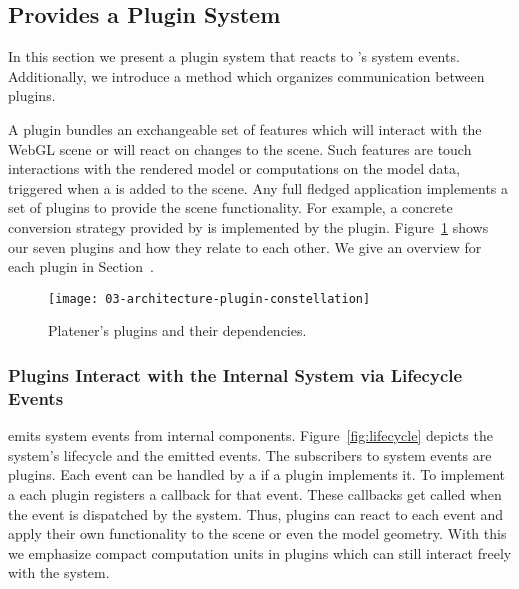 \documentclass[../../ClassicThesis.tex]{subfiles}
\begin{document}
\subsection{{\convertify} Provides a Plugin System}
\label{sec:plugin-system}


In this section we present a plugin system that reacts to
{\convertify}'s system events. Additionally, we introduce a
method which organizes communication between
plugins.


A plugin bundles an exchangeable set of features which will
interact with the WebGL scene or will react on changes to
the scene. Such features are touch interactions with the
rendered model or computations on the model data, triggered
when a  is added to the scene. Any full fledged
application implements a set of plugins to provide the scene
functionality. For example, a concrete conversion strategy
provided by {\platener} is implemented by the
 plugin.
Figure~\ref{fig:plugin-constellation} shows our seven
plugins and how they relate to each other. We give an
overview for each plugin in
Section~.

\begin{figure}[h]
  \centering
  \texttt{[image: 03-architecture-plugin-constellation]}
  \caption{Platener's plugins and their dependencies.}
  \label{fig:plugin-constellation}
\end{figure}

\subsubsection{Plugins Interact with the Internal System via
  Lifecycle Events}


{\convertify} emits system events from internal components.
Figure~\ref{fig:lifecycle} depicts the system's lifecycle
and the emitted events. The subscribers to system events are
plugins. Each event can be handled by a
 if a plugin implements it. To
implement a  each plugin registers
a callback for that event. These callbacks get called when
the event is dispatched by the system. Thus, plugins
can react to each event and apply their own functionality to
the scene or even the model geometry. With this we emphasize
compact computation units in plugins which can still
interact freely with the system.
\end{document}
